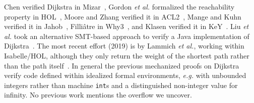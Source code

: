 

Chen verified Dijkstra in Mizar~\cite{chen2003dijkstra}, Gordon \emph{et al.} formalized the reachability property in HOL~\cite{gordon2003executing}, Moore and Zhang verified it in ACL2~\cite{Moore2005}, Mange and Kuhn verified it in Jahob~\cite{mange2007verifying}, Filli\^atre in Why3~\cite{dijkstrawhy3}, and Klasen verified it in KeY~\cite{klasen2010verifying}.  Liu \emph{et al.} took an alternative SMT-based approach to verify a Java implementation of Dijkstra~\cite{6200101}.  The most recent effort (2019) is by Lammich \emph{et al.}, working within Isabelle/HOL, although they only return the weight of the shortest path rather than the path itself~\cite{DBLP:journals/afp/LammichN19}.
In general the previous mechanized proofs on Dijkstra verify code defined within idealized formal environments, \emph{e.g.} with unbounded integers rather than machine \texttt{int}s and a distinguished non-integer value for infinity.  No previous work mentions the overflow we uncover.


